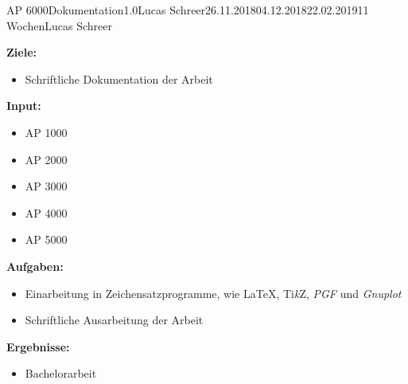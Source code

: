 

\clearpage
\begin{wpd}{AP 6000}{Dokumentation}{1.0}{Lucas Schreer}{26.11.2018}{04.12.2018}{22.02.2019}{11 Wochen}{Lucas Schreer}
    {
    \textbf{Ziele:}
    \begin{itemize}
        \item Schriftliche Dokumentation der Arbeit
    \end{itemize}
    \textbf{Input:}
    \begin{itemize}
        \item AP 1000
        \item AP 2000
        \item AP 3000
        \item AP 4000
        \item AP 5000
    \end{itemize}
    \textbf{Aufgaben:}
    \begin{itemize}
        \item Einarbeitung in Zeichensatzprogramme, wie \LaTeX, {Ti{\em k}Z}, \emph{PGF} und \emph{Gnuplot}
        \item Schriftliche Ausarbeitung der Arbeit
    \end{itemize}
    \textbf{Ergebnisse:}
    \begin{itemize}
        \item Bachelorarbeit
    \end{itemize}
    }
\end{wpd}